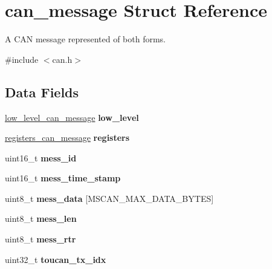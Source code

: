 \hypertarget{unioncan__message}{}\section{can\+\_\+message Struct Reference}
\label{unioncan__message}


A C\+AN message represented of both forms.  




{\ttfamily \#include $<$can.\+h$>$}

\subsection*{Data Fields}
\begin{DoxyCompactItemize}
\item 
\mbox{\label{unioncan__message_a3cb7d7c188fe54d79b492cf6f2bd69c9}} 
\mbox{\hyperlink{structlow__level__can__message}{low\+\_\+level\+\_\+can\+\_\+message}} {\bfseries low\+\_\+level}
\item 
\mbox{\label{unioncan__message_ae6dc77edf6280d7f883b86a34b1fc769}} 
\mbox{\hyperlink{structregisters__can__message}{registers\+\_\+can\+\_\+message}} {\bfseries registers}
\item 
\mbox{\label{unioncan__message_a2fd4e4706214ee16b35b9e1ccc1c56b8}} 
uint16\+\_\+t {\bfseries mess\+\_\+id}
\item 
\mbox{\label{unioncan__message_a39b4a27cb7ef19237346238b665f40c7}} 
uint16\+\_\+t {\bfseries mess\+\_\+time\+\_\+stamp}
\item 
\mbox{\label{unioncan__message_a8b2998c59dcace12b33b31ab94b89776}} 
uint8\+\_\+t {\bfseries mess\+\_\+data} \mbox{[}M\+S\+C\+A\+N\+\_\+\+M\+A\+X\+\_\+\+D\+A\+T\+A\+\_\+\+B\+Y\+T\+ES\mbox{]}
\item 
\mbox{\label{unioncan__message_a3f3dc54d900ffb81c6aec0644a73cac0}} 
uint8\+\_\+t {\bfseries mess\+\_\+len}
\item 
\mbox{\label{unioncan__message_a5803e544b9dce066c73c97fd9dfb3866}} 
uint8\+\_\+t {\bfseries mess\+\_\+rtr}
\item 
\mbox{\label{unioncan__message_a2de26f29dbf5b813beb565219078155a}} 
uint32\+\_\+t {\bfseries toucan\+\_\+tx\+\_\+idx}
\end{DoxyCompactItemize}


